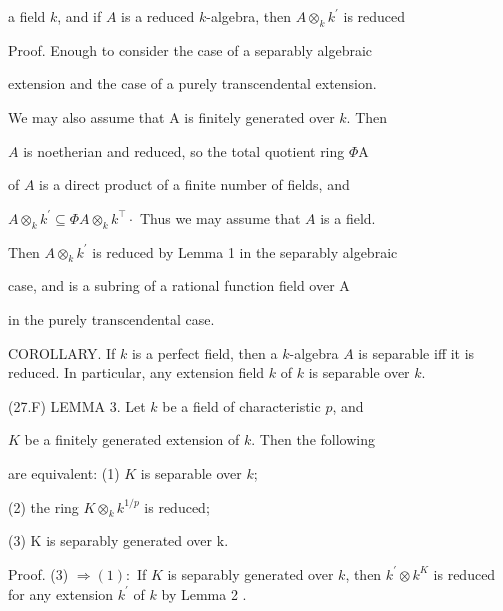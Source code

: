 a field $k$, and if $A$ is a reduced $k$-algebra, then $A \otimes_{k} k^{\prime}$ is reduced

Proof. Enough to consider the case of a separably algebraic

extension and the case of a purely transcendental extension.

We may also assume that A is finitely generated over $k$. Then

$A$ is noetherian and reduced, so the total quotient ring $\Phi \mathrm{A}$

of $A$ is a direct product of a finite number of fields, and

$A \otimes_{k} k^{\prime} \subseteq \Phi A \otimes_{k} k^{\top} \cdot$ Thus we may assume that $A$ is a field.

Then $A \otimes_{k} k^{\prime}$ is reduced by Lemma 1 in the separably algebraic

case, and is a subring of a rational function field over A

in the purely transcendental case.

COROLLARY. If $k$ is a perfect field, then a $k$-algebra $A$ is separable iff it is reduced. In particular, any extension field $k$ of $k$ is separable over $k$.

(27.F) LEMMA 3. Let $k$ be a field of characteristic $p$, and

$K$ be a finitely generated extension of $k$. Then the following

are equivalent: (1) $K$ is separable over $k$;

(2) the ring $K \otimes_{k} k^{1 / p}$ is reduced;

(3) $\mathrm{K}$ is separably generated over $\mathrm{k}$.

Proof. (3) $\Rightarrow(1):$ If $K$ is separably generated over $k$, then $k^{\prime} \otimes k^{K}$ is reduced for any extension $k^{\prime}$ of $k$ by Lemma 2 .

